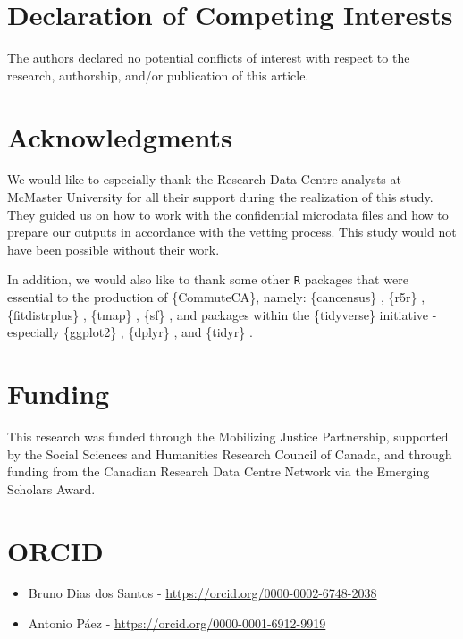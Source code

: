 \documentclass[sn-basic,lineno,pdflatex]{sn-jnl}
\providecommand{\tightlist}{%
  \setlength{\itemsep}{0pt}\setlength{\parskip}{0pt}}
\begin{document}
\section*{Declaration of Competing
Interests}\label{declaration-of-competing-interests}

The authors declared no potential conflicts of interest with respect to
the research, authorship, and/or publication of this article.

\section*{Acknowledgments}\label{acknowledgments}

We would like to especially thank the Research Data Centre analysts at
McMaster University for all their support during the realization of this
study. They guided us on how to work with the confidential microdata
files and how to prepare our outputs in accordance with the vetting
process. This study would not have been possible without their work.

In addition, we would also like to thank some other \texttt{R} packages
that were essential to the production of \{CommuteCA\}, namely:
\{cancensus\} \citep{cancensus}, \{r5r\} \citep{pereira2021},
\{fitdistrplus\} \citep{delignette2015fitdistrplus}, \{tmap\}
\citep{tmap}, \{sf\} \citep{sf}, and packages within the \{tidyverse\}
initiative \citep{tidyverse} - especially \{ggplot2\} \citep{ggplot2},
\{dplyr\} \citep{dplyr}, and \{tidyr\} \citep{tidyr}.

\section*{Funding}\label{funding}

This research was funded through the Mobilizing Justice Partnership,
supported by the Social Sciences and Humanities Research Council of
Canada, and through funding from the Canadian Research Data Centre
Network via the Emerging Scholars Award.

\section*{ORCID}\label{orcid}

\begin{itemize}
\tightlist
\item
  Bruno Dias dos Santos - \url{https://orcid.org/0000-0002-6748-2038}
\item
  Antonio Páez - \url{https://orcid.org/0000-0001-6912-9919}
\end{itemize}
\end{document}
